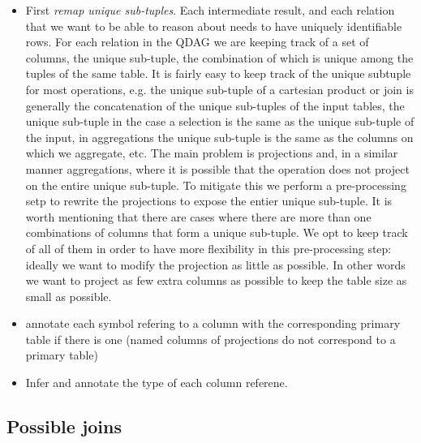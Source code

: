 \begin{itemize}
\item First \emph{remap unique sub-tuples}. Each intermediate result, and each
  relation that we want to be able to reason about needs to have
  uniquely identifiable rows. For each relation in the QDAG we are
  keeping track of a set of columns, the unique sub-tuple, the
  combination of which is unique among the tuples of the same
  table. It is fairly easy to keep track of the unique subtuple for
  most operations, e.g. the unique sub-tuple of a cartesian product or
  join is generally the concatenation of the unique sub-tuples of the
  input tables, the unique sub-tuple in the case a selection is the
  same as the unique sub-tuple of the input, in aggregations the
  unique sub-tuple is the same as the columns on which we aggregate,
  etc. The main problem is projections and, in a similar manner
  aggregations, where it is possible that the operation does not
  project on the entire unique sub-tuple. To mitigate this we perform
  a pre-processing setp to rewrite the projections to expose the
  entier unique sub-tuple. It is worth mentioning that there are cases
  where there are more than one combinations of columns that form a
  unique sub-tuple. We opt to keep track of all of them in order to
  have more flexibility in this pre-processing step: ideally we want
  to modify the projection as little as possible. In other words we
  want to project as few extra columns as possible to keep the table
  size as small as possible.
\item annotate each symbol refering to a column with the corresponding
  primary table if there is one (named columns of projections do not
  correspond to a primary table)
\item Infer and annotate the type of each column referene.
\end{itemize}


\subsection{Possible joins}
\label{sec:possible_joins}

